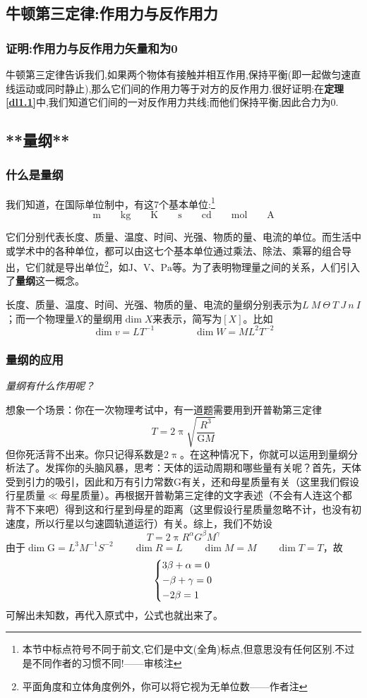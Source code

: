 \subsection{牛顿第三定律:作用力与反作用力}
\subsubsection{证明:作用力与反作用力矢量和为0}
牛顿第三定律告诉我们,如果两个物体有接触并相互作用,保持平衡(即一起做匀速直线运动或同时静止),那么它们间的作用力等于对方的反作用力.很好证明:在\textbf{定理\ref{dl1.1}}中,我们知道它们间的一对反作用力共线;而他们保持平衡,因此合力为0.
\subsection{**量纲**}\label{lg}
\subsubsection{什么是量纲}
我们知道，在国际单位制中，有这7个基本单位:\footnote{本节中标点符号不同于前文,它们是中文(全角)标点,但意思没有任何区别.不过是不同作者的习惯不同!——审核注}
\begin{equation*}
    \mathrm{m}\qquad\mathrm{kg}\qquad\mathrm{K}\qquad\mathrm{s}\qquad\mathrm{cd}\qquad\mathrm{mol}\qquad\mathrm{A}
\end{equation*}

它们分别代表长度、质量、温度、时间、光强、物质的量、电流的单位。而生活中或学术中的各种单位，都可以由这七个基本单位通过乘法、除法、乘幂的组合导出，它们就是导出单位\footnote{平面角度和立体角度例外，你可以将它视为无单位数——作者注}，如$\mathrm{J}$、$\mathrm{V}$、$\mathrm{Pa}$等。为了表明物理量之间的关系，人们引入了\textbf{量纲}这一概念。

长度、质量、温度、时间、光强、物质的量、电流的量纲分别表示为\(L\  M\  \Theta\  T\  J\  n\  I\)；而一个物理量$X$的量纲用\(\dim X\)来表示，简写为$[X]$。比如
\[
    \dim v = LT^{-1}\qquad \qquad \dim W = ML^2T^{-2}
\]

\subsubsection{量纲的应用}
\emph{量纲有什么作用呢？}

想象一个场景：你在一次物理考试中，有一道题需要用到开普勒第三定律
\[
    T = 2\uppi \sqrt{\frac{R^3}{\mathrm{G}M}}
\]
但你死活背不出来。你只记得系数是$2\uppi$。在这种情况下，你就可以运用到量纲分析法了。发挥你的头脑风暴，思考：天体的运动周期和哪些量有关呢？首先，天体受到引力的吸引，因此和万有引力常数\(\mathrm{G}\)有关，还和母星质量有关（这里我们假设行星质量$\ll$母星质量）。再根据开普勒第三定律的文字表述（不会有人连这个都背不下来吧）得到这和行星到母星的距离（这里假设行星质量忽略不计，也没有初速度，所以行星以匀速圆轨道运行）有关。综上，我们不妨设
\[
    T = 2\uppi R^\alpha G^\beta M^\gamma
\]
由于\(\dim\mathrm{G} = L^3M^{-1}S^{-2}\qquad\dim R = L\qquad\dim M = M\qquad\dim T=T\)，故
\[
    \left\{\begin{lgathered}
        3\beta+\alpha=0\\
        -\beta+\gamma=0\\
        -2\beta=1
    \end{lgathered}\right.
\]
可解出未知数，再代入原式中，公式也就出来了。
